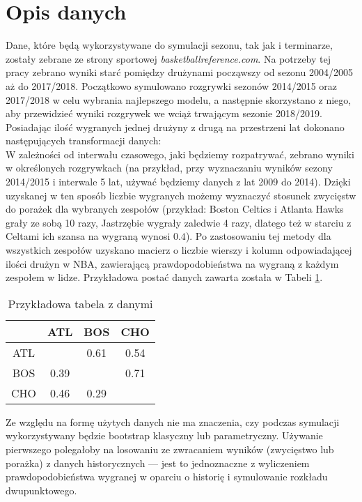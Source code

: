 \documentclass[inzynierska]{pwr_wmat_praca_dyplomowa}
\theoremstyle{plain}
\numberwithin{theorem}{chapter}
\theoremstyle{definition}
\numberwithin{theorem}{chapter}
\begin{document}
\section{Opis danych}
Dane, które będą wykorzystywane do symulacji sezonu, tak jak i terminarze, zostały zebrane ze strony sportowej \textit{basketballreference.com}. \cite{dane}
Na potrzeby tej pracy zebrano wyniki starć pomiędzy drużynami począwszy od sezonu 2004/2005 aż do 2017/2018. Początkowo symulowano rozgrywki sezonów 2014/2015 oraz 2017/2018 w celu wybrania najlepszego modelu, a następnie skorzystano z niego, aby przewidzieć wyniki rozgrywek we wciąż trwającym sezonie 2018/2019.
Posiadając ilość wygranych jednej drużyny z drugą na przestrzeni lat dokonano następujących transformacji danych:
\\
W zależności od interwału czasowego, jaki będziemy rozpatrywać, zebrano wyniki w określonych rozgrywkach (na przykład, przy wyznaczaniu wyników sezony 2014/2015 i interwale 5 lat, używać będziemy danych z lat 2009 do 2014). Dzięki uzyskanej w ten sposób liczbie wygranych możemy wyznaczyć stosunek zwycięstw do porażek dla wybranych zespołów (przykład: Boston Celtics i Atlanta Hawks grały ze sobą 10 razy, Jastrzębie wygrały zaledwie 4 razy, dlatego też w starciu z Celtami ich szansa na wygraną wynosi $0.4$). Po zastosowaniu tej metody dla wszystkich zespołów uzyskano macierz o liczbie wierszy i kolumn odpowiadającej ilości drużyn w NBA, zawierającą prawdopodobieństwa na wygraną z każdym zespołem w lidze. Przykładowa postać danych zawarta została w Tabeli \ref{dane_tabela}.
\begin{table}[]
	\centering
	\begin{tabular}{|c|c|c|c|}
		\hline
		&ATL & BOS & CHO\\ \hline
		ATL &  & 0.61&0.54\\ \hline
		BOS & 0.39 & &0.71\\ \hline
		CHO & 0.46 & 0.29&\\ \hline
	\end{tabular}
	\caption{Przykładowa tabela z danymi}\label{dane_tabela}	
\end{table}

Ze względu na formę użytych danych nie ma znaczenia, czy podczas symulacji wykorzystywany będzie bootstrap klasyczny lub parametryczny. Używanie pierwszego polegałoby na losowaniu ze zwracaniem wyników (zwycięstwo lub porażka) z danych historycznych --- jest to jednoznaczne z wyliczeniem prawdopodobieństwa wygranej w oparciu o historię i symulowanie rozkładu dwupunktowego.
\end{document}
